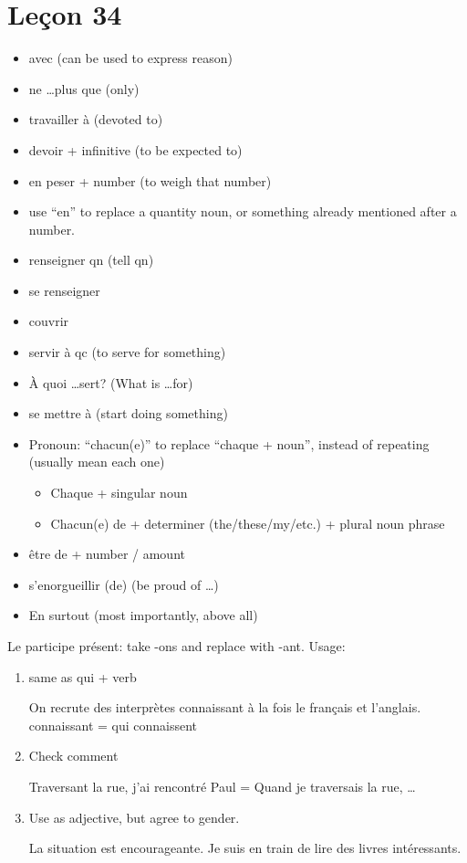\documentclass{book}
\begin{document}
\chapter{Leçon 34}
    \begin{itemize}
        \item avec (can be used to express reason)
        \item ne \dots plus que (only)
        \item travailler à (devoted to)
        \item devoir + infinitive (to be expected to)
        \item en peser + number (to weigh that number)
        \item use ``en'' to replace a quantity noun, or something already mentioned after a number.
        \item renseigner qn (tell qn)
        \item se renseigner %
        \item couvrir %
        \item servir à qc (to serve for something)
        \item À quoi \dots sert? (What is \dots for)
        \item se mettre à (start doing something)
        \item Pronoun: ``chacun(e)'' to replace ``chaque + noun'', instead of repeating (usually mean each one)
            \begin{itemize}
                \item Chaque + singular noun
                \item Chacun(e) de + determiner (the/these/my/etc.) + plural noun phrase
            \end{itemize}
        \item être de + number / amount
        \item s'enorgueillir (de) (be proud of \dots)
        \item En surtout (most importantly, above all)
    \end{itemize}
    Le participe présent: take -ons and replace with -ant. Usage:
    \begin{enumerate}
        \item same as qui + verb
        \begin{center}
            On recrute des interprètes connaissant à la fois le français et l'anglais.
            \\
            connaissant = qui connaissent
        \end{center}
        \item Check comment %
        \begin{center}
            Traversant la rue, j'ai rencontré Paul = Quand je traversais la rue, \dots
        \end{center}
        \item Use as adjective, but agree to gender.
        \begin{center}
            La situation est encourageante. Je suis en train de lire des livres intéressants.
        \end{center}
    \end{enumerate}
\end{document}
